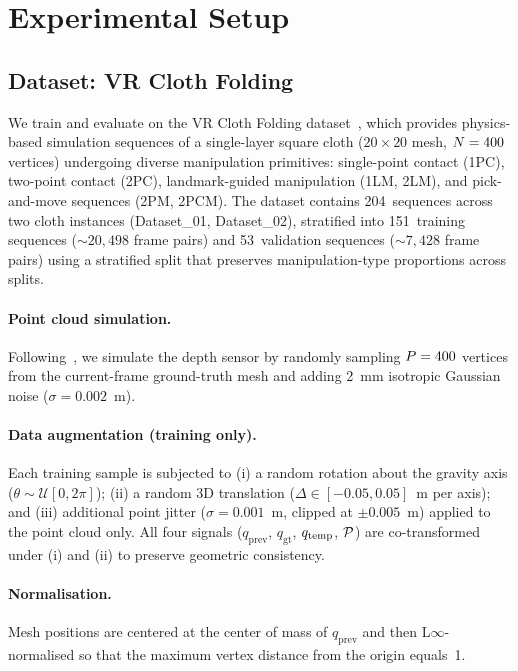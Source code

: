 \documentclass{article}
\begin{document}

\section{Experimental Setup}
\label{sec:experiments}

\subsection{Dataset: VR Cloth Folding}

We train and evaluate on the VR Cloth Folding dataset~\cite{BorrasICRA23}, which provides physics-based simulation sequences of a single-layer square cloth ($20\!\times\!20$ mesh, $N=400$ vertices) undergoing diverse manipulation primitives: single-point contact (1PC), two-point contact (2PC), landmark-guided manipulation (1LM, 2LM), and pick-and-move sequences (2PM, 2PCM).
The dataset contains 204~sequences across two cloth instances (Dataset\_01, Dataset\_02), stratified into 151~training sequences (${\sim}20{,}498$ frame pairs) and 53~validation sequences (${\sim}7{,}428$ frame pairs) using a stratified split that preserves manipulation-type proportions across splits.

\paragraph{Point cloud simulation.}
Following~\cite{tian2025uniclothdiff}, we simulate the depth sensor by randomly sampling $P=400$ vertices from the current-frame ground-truth mesh and adding 2~mm isotropic Gaussian noise ($\sigma = 0.002$~m).

\paragraph{Data augmentation (training only).}
Each training sample is subjected to (i) a random rotation about the gravity axis ($\theta \sim \mathcal{U}[0, 2\pi]$); (ii) a random 3D translation ($\Delta \in [-0.05, 0.05]$~m per axis); and (iii) additional point jitter ($\sigma = 0.001$~m, clipped at $\pm 0.005$~m) applied to the point cloud only.
All four signals ($q_\text{prev}$, $q_\text{gt}$, $q_\mathrm{temp}$, $\mathcal{P}$) are co-transformed under (i) and (ii) to preserve geometric consistency.

\paragraph{Normalisation.}
Mesh positions are centered at the center of mass of $q_\text{prev}$ and then L$\infty$-normalised so that the maximum vertex distance from the origin equals~1.
\end{document}
